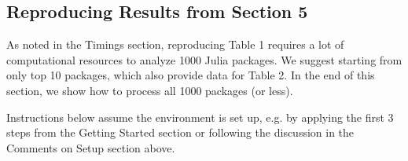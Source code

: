 \documentclass[
]{article}
\begin{document}
\hypertarget{reproducing-results-from-section-5}{%
\subsection{Reproducing Results from Section
5}\label{reproducing-results-from-section-5}}

As noted in the Timings section, reproducing Table 1 requires a lot of
computational resources to analyze 1000 Julia packages. We suggest starting
from only top 10 packages, which also provide data for Table 2. In the end of
this section, we show how to process all 1000 packages (or less).

Instructions below assume the environment is set up, e.g. by applying the first 3
steps from the Getting Started section or following the discussion in the
Comments on Setup section above.
\end{document}
